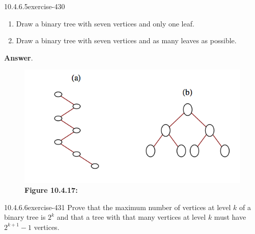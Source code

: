 \documentclass[twoside,10pt,]{book}
\numberwithin{equation}{section}
\begin{document}
\begin{divisionsolution}{10.4.6.5}{}{exercise-430}%
\hypertarget{p-3750}{}%
\leavevmode%
\begin{enumerate}[label=(\alph*)]
\item\hypertarget{li-1726}{}\hypertarget{p-3751}{}%
Draw a binary tree with seven vertices and only one leaf.%
\item\hypertarget{li-1727}{}\hypertarget{p-3752}{}%
Draw a binary tree with seven vertices and as many leaves as possible.%
\end{enumerate}
%
\par\smallskip%
\noindent\textbf{Answer}.\quad%
\leavevmode%
\begin{figure}
\centering
\includegraphics[width=0.9\linewidth]{images/fig-sol-10-4-5.png}
\caption*{\textbf{Figure 10.4.17:} }
\end{figure}
\end{divisionsolution}%
\begin{divisionsolution}{10.4.6.6}{}{exercise-431}%
\hypertarget{p-3753}{}%
Prove that the maximum number of vertices at level \(k\) of a binary tree is \(2^k\) and that a tree with that many vertices at level \(k\) must have  \(2^{k+1}-1\) vertices.%
\end{divisionsolution}%
\end{document}
